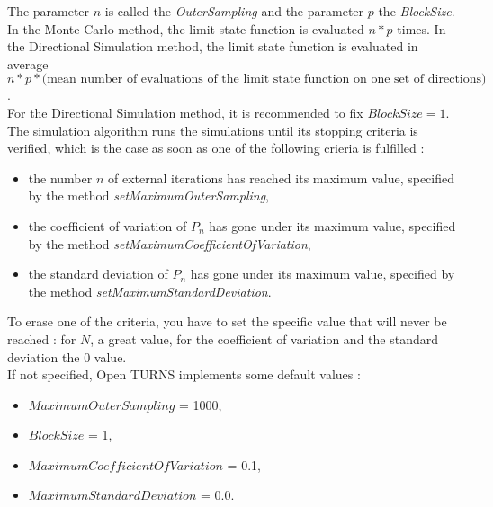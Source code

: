 The parameter $n$ is called the {\itshape OuterSampling} and the parameter $p$ the {\itshape BlockSize}.\\

In the Monte Carlo method, the limit state function is evaluated $n*p$ times. In the Directional Simulation method, the limit state function is evaluated in average $n*p* \mbox{(mean number of evaluations of the limit state function on one set of directions)}$.\\

For the Directional Simulation method, it is recommended to fix $BlockSize = 1$.\\

The simulation algorithm runs the simulations until its stopping criteria is verified, which is the case as soon as one of the following crieria is fulfilled :
\begin{itemize}
\item the number $n$ of external iterations has reached its maximum value, specified by the method {\em setMaximumOuterSampling},
\item the coefficient of variation of $P_n$ has gone under its maximum value, specified by the method {\em setMaximumCoefficientOfVariation},
\item the standard deviation of  $P_n$ has gone under its maximum value, specified by the method {\em setMaximumStandardDeviation}.
\end{itemize}

To erase one of the criteria, you have to set the specific value that will never be reached : for $N$, a great value, for the  coefficient of variation  and the standard deviation the $0$ value.\\

If not specified, Open TURNS implements some default values :
\begin{itemize}
\item $MaximumOuterSampling$ = 1000,
\item $BlockSize$ = 1,
\item $MaximumCoefficientOfVariation$ = 0.1,
\item $MaximumStandardDeviation$ = 0.0.
\end{itemize}





